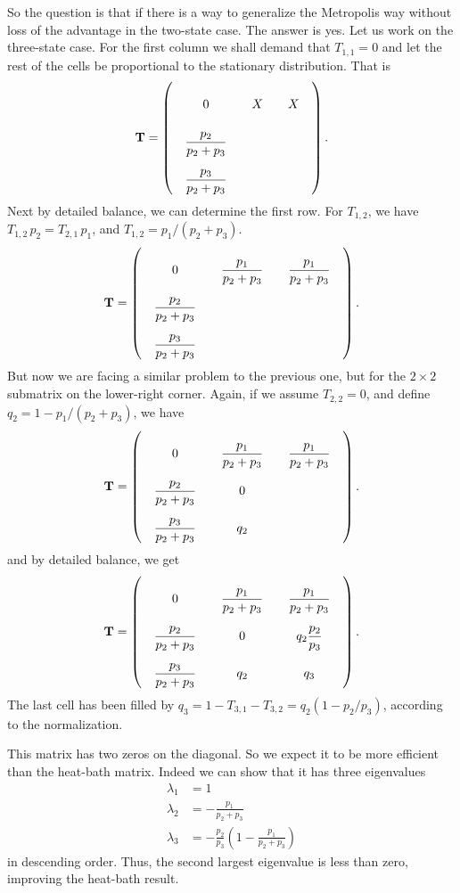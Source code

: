 \documentclass[12pt]{article}
\begin{document}
So the question is that if there is a way to generalize
the Metropolis way without loss of the advantage in the two-state case.
%
The answer is yes.
%
Let us work on the three-state case.
%
For the first column we shall demand that $T_{1,1} = 0$
and let the rest of the cells be proportional to
the stationary distribution. That is
$$
\mathbf T =
\left(
  \arraycolsep=10.0pt\def\arraystretch{2.5}
  \begin{array}{cccccc}
    0   &  X & X \\
    \dfrac{p_2}{p_2+p_3} &  & \\
    \dfrac{p_3}{p_2+p_3} &  &
  \end{array}
\right).
$$
Next by detailed balance, we can determine the first row.
For $T_{1,2}$,
we have $T_{1,2} \, p_2 = T_{2,1} \, p_1$,
and $T_{1,2} = p_1/(p_2 + p_3)$.
$$
\mathbf T =
\left(
  \arraycolsep=10.0pt\def\arraystretch{2.5}
  \begin{array}{cccccc}
    0   &  \dfrac{p_1}{p_2+p_3} & \dfrac{p_1}{p_2+p_3} \\
    \dfrac{p_2}{p_2+p_3} &  & \\
    \dfrac{p_3}{p_2+p_3} &  &
  \end{array}
\right).
$$
But now we are facing a similar problem to the previous one,
but for the $2\times 2$ submatrix on the lower-right corner.
Again, if we assume $T_{2,2} = 0$, and define $q_2 = 1- p_1/(p_2 + p_3)$,
we have
$$
\mathbf T =
\left(
  \arraycolsep=10.0pt\def\arraystretch{2.5}
  \begin{array}{cccccc}
    0   &  \dfrac{p_1}{p_2+p_3} & \dfrac{p_1}{p_2+p_3} \\
    \dfrac{p_2}{p_2+p_3} &  0 & \\
    \dfrac{p_3}{p_2+p_3} &  q_2 &
  \end{array}
\right).
$$
and by detailed balance, we get
$$
\mathbf T =
\left(
  \arraycolsep=10.0pt\def\arraystretch{2.5}
  \begin{array}{cccccc}
    0   &  \dfrac{p_1}{p_2+p_3} & \dfrac{p_1}{p_2+p_3} \\
    \dfrac{p_2}{p_2+p_3} &  0 & q_2 \dfrac{p_2}{p_3} \\
    \dfrac{p_3}{p_2+p_3} &  q_2 & q_3
  \end{array}
\right).
$$
The last cell has been filled by $q_3 = 1 - T_{3,1} - T_{3,2} = q_2 (1 - p_2/p_3)$,
according to the normalization.

This matrix has two zeros on the diagonal.
So we expect it to be more efficient than the heat-bath matrix.
Indeed we can show that it has three eigenvalues
\begin{align}
  \lambda_1 &= 1 \\
  \lambda_2 &= -\frac{p_1}{p_2+p_3} \\
  \lambda_3 &= -\frac{p_2}{p_3}\left( 1 - \frac{p_1}{p_2+p_3} \right)
  \label{eq:dbimproved}
\end{align}
in descending order.
Thus, the second largest eigenvalue is less than zero,
improving the heat-bath result.
\end{document}
